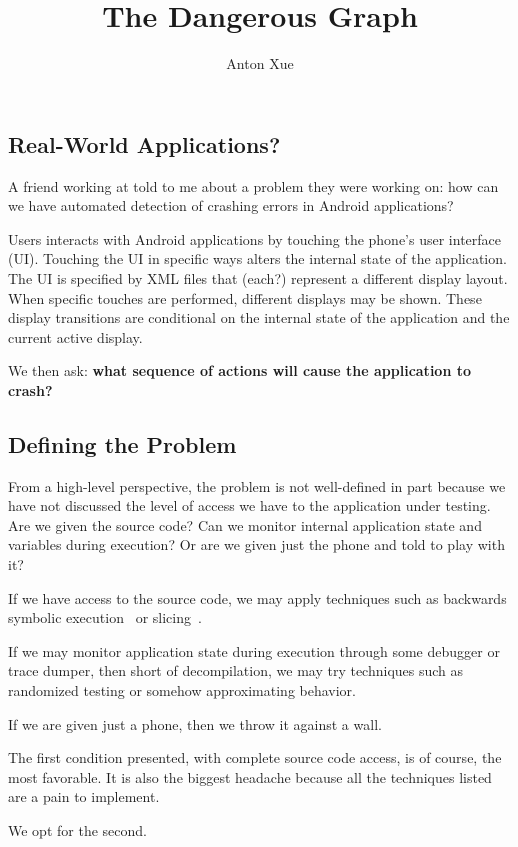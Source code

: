 \documentclass[12pt]{article}
\title{The Dangerous Graph}
\author{Anton Xue}
\date{}
\let\company\undefined
\newcommand{\company}{\textbf{Big Tech Company}}
\newcommand{\android}{Android}
\begin{document}
\maketitle

\subsection{Real-World Applications?}

A friend working at \company{} told to me about a problem
they were working on:
how can we have automated detection of crashing
errors in \android{} applications?

Users interacts with \android{} applications by touching
the phone's user interface (UI).
Touching the UI in specific ways alters the internal state of the application.
The UI is specified by XML files that (each?) represent a
different display layout.
When specific touches are performed, different displays may be shown.
These display transitions are conditional on the internal state of the
application and the current active display.

We then ask:
\textbf{what sequence of actions will cause the application to crash?}


\subsection{Defining the Problem}
From a high-level perspective, the problem is not well-defined in part
because we have not discussed the level of access we have to the
application under testing.
Are we given the source code?
Can we monitor internal application state and variables during execution?
Or are we given just the phone and told to play with it?

If we have access to the source code, we may apply techniques such as
backwards symbolic execution~\cite{baldoni-backwards} or
slicing~\cite{weiser-slicing}.

If we may monitor application state during execution through some debugger
or trace dumper, then short of decompilation, we may try techniques such
as randomized testing or somehow approximating behavior.

If we are given just a phone, then we throw it against a wall.

The first condition presented, with complete source code access, is of
course, the most favorable.
It is also the biggest headache because all the techniques listed are
a pain to implement.

We opt for the second.
\end{document}

